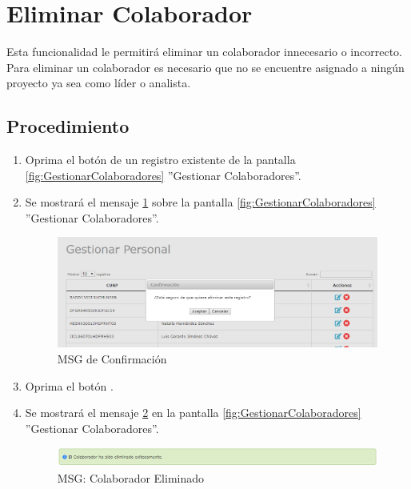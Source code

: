 \hypertarget{cv:eliminarColaborador}{\section{Eliminar Colaborador}} \label{sec:eliminarColaborador}

	Esta funcionalidad le permitirá eliminar un colaborador innecesario o incorrecto. Para eliminar un colaborador es necesario que no se encuentre asignado a ningún proyecto ya sea como líder o analista.

		\subsection{Procedimiento}

			\begin{enumerate}
	
			\item Oprima el botón \IUBotonEliminar{} de un registro existente de la pantalla \ref{fig:GestionarColaboradores} ''Gestionar Colaboradores''.
	
			\item Se mostrará el mensaje \ref{fig:confirmaEliminaColaborador} sobre la pantalla \ref{fig:GestionarColaboradores} ''Gestionar Colaboradores''.
			
			\begin{figure}[htbp!]
				\begin{center}
					\includegraphics[scale=0.6]{roles/administrador/colaboradores/gestionarColaboradores/pantallas/IU3-3MSG10}
					\caption{MSG de Confirmación}
					\label{fig:confirmaEliminaColaborador}
				\end{center}
			\end{figure}
						
			\item Oprima el botón \IUAceptar.
			
			\item Se mostrará el mensaje \ref{fig:colaboradorEliminado} en la pantalla \ref{fig:GestionarColaboradores} ''Gestionar Colaboradores''.
			
			\begin{figure}[htbp!]
				\begin{center}
					\includegraphics[scale=0.6]{roles/administrador/colaboradores/gestionarColaboradores/pantallas/IU3-3MSG1}
					\caption{MSG: Colaborador Eliminado}
					\label{fig:colaboradorEliminado}
				\end{center}
			\end{figure}
			\end{enumerate}